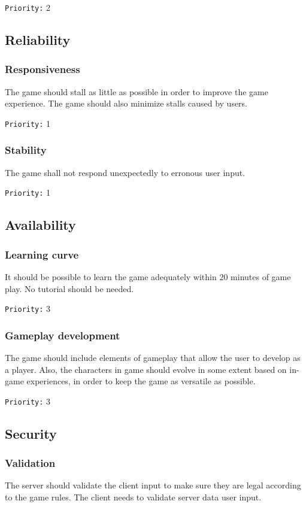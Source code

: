\documentclass[a4paper,10pt]{article}
\newcommand{\prio}[1]{\texttt{Priority:} #1}
\begin{document}
\prio{2}

\subsection{Reliability}
\subsubsection{Responsiveness}
The game should stall as little as possible in order to improve the game experience. The game should also minimize stalls caused by users.

\prio{1}

\subsubsection{Stability}
The game shall not respond unexpectedly to erronous user input.

\prio{1}

\subsection{Availability}
\subsubsection{Learning curve}
It should be possible to learn the game adequately within 20 minutes of game play. No tutorial should be needed.

\prio{3}

\subsubsection{Gameplay development}
The game should include elements of gameplay that allow the user to develop as a player. Also, the characters in game should evolve in some extent based on in-game experiences, in order to keep the game as versatile as possible.

\prio{3}

\subsection{Security}
\subsubsection{Validation}
\label{cheating}
The server should validate the client input to make sure they are legal according to the game rules. The client needs to validate server data user input. 
\end{document}
